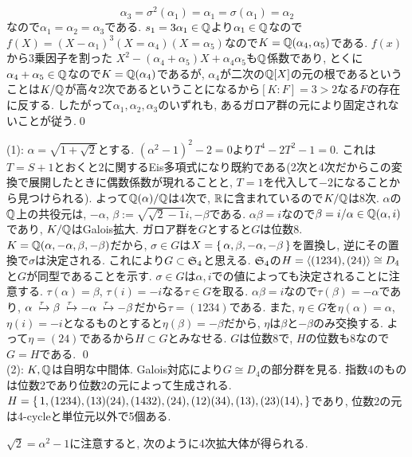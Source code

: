 {\begin{probans}
\[\alpha_3 = \sigma^2(\alpha_1) = \alpha_1 = \sigma(\alpha_1) = \alpha_2 \]
なので$\alpha_1=\alpha_2=\alpha_3$である. $s_1 = 3\alpha_1 \in \mathbb{Q}$より$\alpha_1\in \mathbb{Q}$なので$f(X) = (X-\alpha_1)^3 (X=\alpha_4)(X=\alpha_5)$なので$K=\mathbb{Q}(\alpha_4,\alpha_5)$である. $f(x)$から3乗因子を割った $X^2 - (\alpha_4+\alpha_5)X + \alpha_4\alpha_5$も$\mathbb{Q}$係数であり, とくに $\alpha_4+\alpha_5 \in \mathbb{Q}$なので$K=\mathbb{Q}(\alpha_4)$であるが, $\alpha_4$が二次の$\mathbb{Q}[X]$の元の根であるということは$K/\mathbb{Q}$が高々2次であるということになるから$[K:F] = 3 > 2$なる$F$の存在に反する. したがって$\alpha_1,\alpha_2,\alpha_3$のいずれも, あるガロア群の元により固定されないことが従う.\qed
\end{probans}



\begin{probans}
(1): $\alpha = \sqrt{1+\sqrt{2}}$とする. $(\alpha^2 - 1)^2 - 2 = 0$より$T^4 - 2T^2 - 1 = 0$. これは$T=S+1$とおくと$2$に関するEis多項式になり既約である(2次と4次だからこの変換で展開したときに偶数係数が現れることと, $T=1$を代入して$-2$になることから見つけられる). よって$\mathbb{Q}(\alpha)/\mathbb{Q}$は4次で, $\mathbb{R}$に含まれているので$K/\mathbb{Q}$は8次. $\alpha$の$\mathbb{Q}$上の共役元は, $-\alpha$, $\beta:= \sqrt{\sqrt{2}-1}i , -\beta$である. $\alpha\beta = i$なので$\beta = i/\alpha \in \mathbb{Q}(\alpha,i)$であり, $K/\mathbb{Q}$はGalois拡大. ガロア群を$G$とすると$G$は位数8.  $K=\mathbb{Q}(\alpha,-\alpha,\beta,-\beta)$だから, $\sigma\in G$は$X=\set{\alpha,\beta,-\alpha,-\beta}$を置換し, 逆にその置換で$\sigma$は決定される. これにより$G\subset \mathfrak{S}_{4}$と思える.  $\mathfrak{S}_{4}$の$H=\langle(1234), (24)\rangle\cong D_{4}$と$G$が同型であることを示す. $\sigma\in G$は$\alpha,i$での値によっても決定されることに注意する. $\tau(\alpha) = \beta$, $\tau(i) = -i$なる$\tau \in G$を取る. $\alpha\beta = i$なので$\tau(\beta) = -\alpha$であり, $\alpha\xmapsto{\tau} \beta\xmapsto{\tau}-\alpha \xmapsto{\tau} -\beta$だから$\tau = (1234)$である. また, $\eta\in G$を$\eta(\alpha) = \alpha$, $\eta(i) = -i$となるものとすると$\eta(\beta) = -\beta$だから, $\eta$は$\beta$と$-\beta$のみ交換する. よって$\eta=(24)$であるから$H\subset G$とみなせる. $G$は位数8で, $H$の位数も8なので$G=H$である. \qed \\
(2): $K,\mathbb{Q}$は自明な中間体. Galois対応により$G\cong D_{4}$の部分群を見る. 指数4のものは位数2であり位数2の元によって生成される. $H=\set{1, (1234),(13)(24),(1432),(24), (12)(34), (13), (23)(14), }$であり, 位数2の元は4-cycleと単位元以外で5個ある.\par  $\sqrt{2} = \alpha^2 - 1$に注意すると,   次のように4次拡大体が得られる.

\end{probans}}
